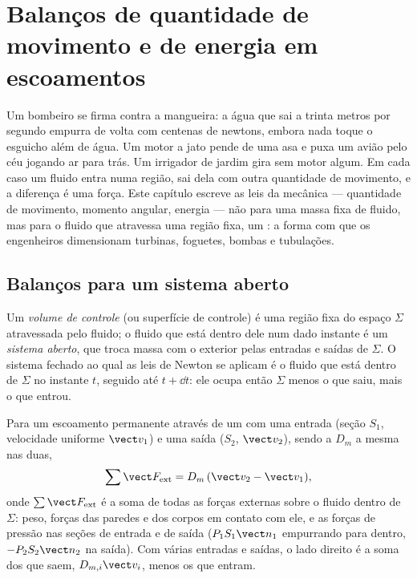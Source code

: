 \chapter{Balanços de quantidade de movimento e de energia em escoamentos}\label{ch:b2:flow-balances}

Um bombeiro se firma contra a mangueira: a água que sai a trinta
metros por segundo empurra de volta com centenas de newtons, embora nada
toque o esguicho além de água. Um motor a jato pende de uma asa e puxa
um avião pelo céu jogando ar para trás. Um irrigador de jardim
gira sem motor algum. Em cada caso um fluido entra numa região,
sai dela com outra quantidade de movimento, e a diferença é uma força.
Este capítulo escreve as leis da mecânica --- quantidade de movimento, momento
angular, energia --- não para uma massa fixa de fluido, mas para o fluido
que atravessa uma região fixa, um \emph{}: a forma com que
os engenheiros dimensionam turbinas, foguetes, bombas e tubulações.

\section{Balanços para um sistema aberto}

\begin{definition}\label{def:b2:flow-balances:cv}
Um \emph{volume de controle} (ou superfície de controle) é uma região fixa do espaço
$\Sigma$ atravessada pelo fluido; o fluido que está dentro dele num dado instante
é um \emph{sistema aberto}, que troca massa com o exterior pelas
entradas e saídas de $\Sigma$. O sistema fechado ao qual as leis de Newton
se aplicam é o fluido que está dentro de $\Sigma$ no instante $t$, seguido
até $t + \dd t$: ele ocupa então $\Sigma$ menos o que saiu, mais o que
entrou.
\end{definition}

\begin{theorem}\label{thm:b2:flow-balances:momentum}
Para um escoamento permanente através de um  com uma entrada (seção
$S_1$, velocidade uniforme $\vect v_1$) e uma saída ($S_2$, $\vect v_2$), sendo a
 $D_m$ a mesma nas duas,
\[
\sum\vect F_{\text{ext}} = D_m\,(\vect v_2 - \vect v_1) ,
\]
onde $\sum\vect F_{\text{ext}}$ é a soma de todas as forças externas sobre o
fluido dentro de $\Sigma$: peso, forças das paredes e dos corpos em contato
com ele, e as forças de pressão nas seções de entrada e de saída
($P_1S_1\vect n_1$ empurrando para dentro, $-P_2S_2\vect n_2$ na saída). Com
várias entradas e saídas, o lado direito é a soma dos  que saem, $D_{m,i}\vect v_i$, menos os que entram.
\end{theorem}

